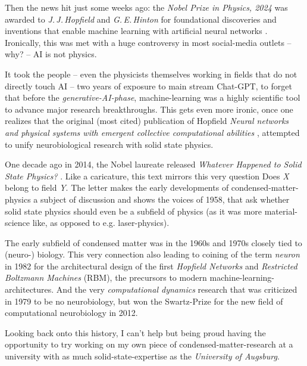 Then the news hit just some weeks ago: the \emph{Nobel Prize in Physics, 2024} was awarded to \emph{J.\,J.\,Hopfield} and \emph{G.\,E.\,Hinton} \glqq for foundational discoveries and inventions that enable machine learning with artificial neural networks\grqq{} \cite{nobelPrizePhysics2024}.
Ironically, this was met with a huge controversy \cite{NobelPrizeControversy} in most social-media outlets -- why? -- \glqq AI is not physics\grqq.

It took the people -- even the physicists themselves working in fields that do not directly touch AI -- two years of exposure to main stream Chat-GPT, to forget that before the \emph{generative-AI-phase}, machine-learning was a highly scientific tool to advance major research breakthroughs.
This gets even more ironic, once one realizes that the original (most cited) publication of Hopfield \emph{\glqq Neural networks and physical systems with emergent collective computational abilities\grqq} \cite{basePaperMachineLearning}, attempted to unify neurobiological research with solid state physics. 

One decade ago in 2014, the Nobel laureate released \emph{\glqq Whatever Happened to Solid State Physics?\grqq} \cite{hopfieldConnectionToSolidStatePhysics}. 
Like a caricature, this text mirrors this very question \glqq Does \emph{X} belong to field \emph{Y}\grqq.
The letter makes the early developments of condensed-matter-physics a subject of discussion and shows the voices of 1958, that ask whether solid state physics should even be a subfield of physics (as it was more material-science like, as opposed to e.g. laser-physics).

The early subfield of condensed matter was in the 1960s and 1970s closely tied to (neuro-) biology. 
This very connection also leading to coining of the term \emph{neuron} in 1982 for the architectural design of the first \emph{Hopfield Networks} and \emph{Restricted Boltzmann Machines} (RBM), the precursors to modern machine-learning-architectures.
And the very \emph{computational dynamics} research that was criticized in 1979 to be \glqq no neurobiology\grqq, but won the Swartz-Prize for the new field of computational neurobiology in 2012.

Looking back onto this history, I can't help but being proud having the opportunity to try working on my own piece of condensed-matter-research at a university with as much solid-state-expertise as the \emph{University of Augsburg}.